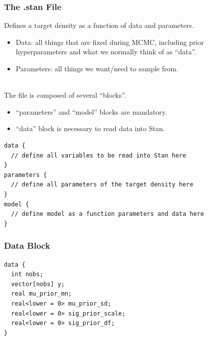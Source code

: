 \documentclass[xcolor=dvipsnames]{beamer}
\begin{document}
\begin{frame}[fragile]
\frametitle{The .stan File}
Defines a target density as a function of data and parameters.
\begin{itemize}
\item Data: all things that are fixed during MCMC, including prior hyperparameters and what we normally think of as ``data''.
\item Parameters: all things we want/need to sample from.\\~\\
\end{itemize}
The file is composed of several ``blocks''. 
\begin{itemize} 
\item ``parameters'' and ``model'' blocks are mandatory. 
\item ``data'' block is necessary to read data into Stan.
\end{itemize}
\begin{verbatim}
data {
  // define all variables to be read into Stan here
}
parameters {
  // define all parameters of the target density here
}
model {
  // define model as a function parameters and data here
}
\end{verbatim}
\end{frame}

\begin{frame}[fragile]
\frametitle{Data Block}
\begin{verbatim}
data {
  int nobs;
  vector[nobs] y;
  real mu_prior_mn;
  real<lower = 0> mu_prior_sd;
  real<lower = 0> sig_prior_scale;
  real<lower = 0> sig_prior_df;
}
\end{verbatim}
\end{frame}
\end{document}
